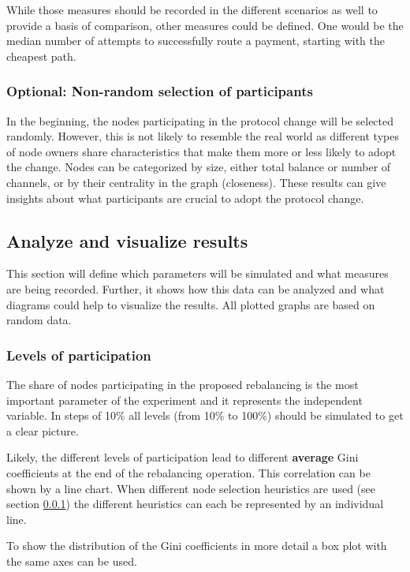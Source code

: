 \documentclass[final]{fhnwreport}       %
\begin{document}
While those measures should be recorded in the different scenarios as well to provide a basis of comparison, other measures could be defined. One would be the median number of attempts to successfully route a payment, starting with the cheapest path.

\subsubsection{Optional: Non-random selection of participants}\label{sec:selpart}
In the beginning, the nodes participating in the protocol change will be selected randomly. However, this is not likely to resemble the real world as different types of node owners share characteristics that make them more or less likely to adopt the change. Nodes can be categorized by size, either total balance or number of channels, or by their centrality in the graph (closeness). These results can give insights about what participants are crucial to adopt the protocol change. 

\subsection{Analyze and visualize results}\label{sec:o_anal}

This section will define which parameters will be simulated and what measures are being recorded. Further, it shows how this data can be analyzed and what diagrams could help to visualize the results. All plotted graphs are based on random data.

\subsubsection{Levels of participation}
The share of nodes participating in the proposed rebalancing is the most important parameter of the experiment and it represents the independent variable. In steps of 10\% all levels (from 10\% to 100\%) should be simulated to get a clear picture.


Likely, the different levels of participation lead to different \textbf{average} Gini coefficients at the end of the rebalancing operation. This correlation can be shown by a line chart. When different node selection heuristics are used (see section \ref{sec:selpart}) the different heuristics can each be represented by an individual line. 

To show the distribution of the Gini coefficients in more detail a box plot with the same axes can be used.
\end{document}
